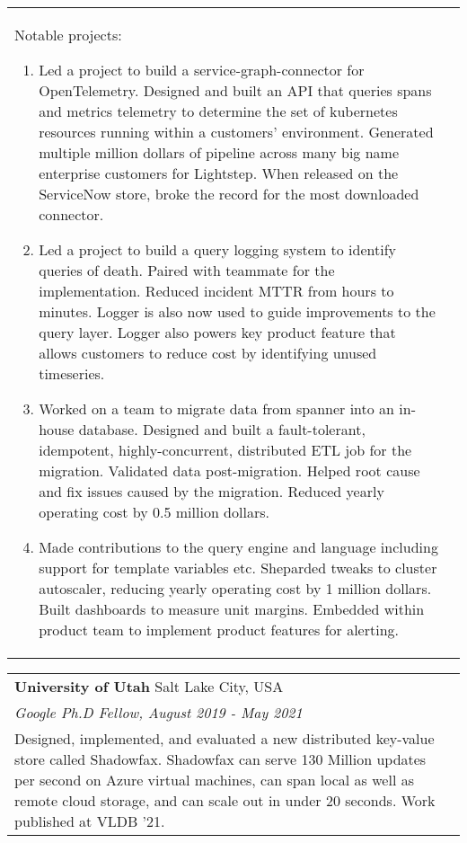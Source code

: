 \documentclass[margin,line]{res}
\begin{document}
\begin{resume}
\begin{tabular}{@{}p{5.5in}p{4in}}
\vspace{-1pt}
{\small
Notable projects:
\begin{enumerate}
\item Led a project to build a service-graph-connector for
OpenTelemetry. Designed and built an API that queries spans and metrics
telemetry to determine the set of kubernetes resources running within a
customers' environment. Generated multiple million dollars of pipeline
across many big name enterprise customers for Lightstep. When released on
the ServiceNow store, broke the record for the most downloaded connector.
\item Led a project to build a query logging system to identify queries of death.
Paired with teammate for the implementation. Reduced incident
MTTR from hours to minutes. Logger is also now
used to guide improvements to the query layer. Logger also powers key
product feature that allows customers to reduce cost by identifying unused
timeseries.
\item Worked on a team to migrate data from spanner into an in-house
database. Designed and built a fault-tolerant, idempotent, highly-concurrent,
distributed ETL job for the migration. Validated data post-migration.
Helped root cause and fix issues caused by the migration.
Reduced yearly operating cost by 0.5 million dollars.
\item Made contributions to the query engine and language including
support for template variables etc. Sheparded tweaks to cluster
autoscaler, reducing yearly operating cost by 1 million dollars.
Built dashboards to measure unit margins. Embedded within product team
to implement product features for alerting.
\end{enumerate}
}\\
\end{tabular}

\vspace{-7pt}
\begin{tabular}{@{}p{5.5in}p{4in}}
{\bf University of Utah} \dotfill Salt Lake City, USA \\
{\small\em Google Ph.D Fellow, August 2019 - May 2021} \\
{\small Designed, implemented, and evaluated a new distributed key-value
store called Shadowfax. Shadowfax can serve 130 Million updates per
second on Azure virtual machines, can span local as well as remote cloud
storage, and can scale out in under 20 seconds. Work published at
VLDB '21.}\\
\end{tabular}


\end{resume}
\end{document}
